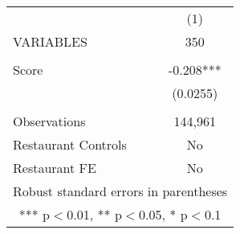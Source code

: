 \begin{tabular}{lc} \hline
 & (1) \\
VARIABLES & 350 \\ \hline
 &  \\
Score & -0.208*** \\
 & (0.0255) \\
 &  \\
Observations & 144,961 \\
Restaurant Controls & No \\
 Restaurant FE & No \\ \hline
\multicolumn{2}{c}{ Robust standard errors in parentheses} \\
\multicolumn{2}{c}{ *** p$<$0.01, ** p$<$0.05, * p$<$0.1} \\
\end{tabular}
